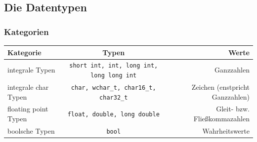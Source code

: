 \documentclass[a4paper]{report}
\begin{document}
\subsection{Die Datentypen}

\subsubsection{Kategorien}
 \begin{center}
\begin{tabular}{|l|c|r|}
	\hline
	\textbf{Kategorie} & \textbf{Typen} & \textbf{Werte}\\ \hline 
	integrale Typen & \texttt{short int, int, long int, long long int} & Ganzzahlen \\ 
	integrale char Typen & \texttt{char, wchar\_t, char16\_t, char32\_t} & Zeichen (enstpricht Ganzzahlen) \\
	floating point Typen & \texttt{float, double, long double} & Gleit- bzw. Fließkommazahlen \\
	boolsche Typen & \texttt{bool} & Wahrheitswerte \\ \hline
\end{tabular}
\end{center}
\end{document}
